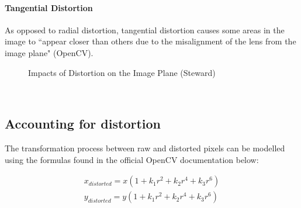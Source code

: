 \documentclass[11pt]{scrartcl}
\begin{document}
\paragraph{Tangential Distortion}
As opposed to radial distortion, tangential distortion causes some areas in the image to ``appear closer than others due to the misalignment of the lens from the image plane" (OpenCV). 
\\
\begin{figure}[!htb]
	\centering
	\qquad
	\label{fig:example}%
	\caption{Impacts of Distortion on the Image Plane (Steward)}
\end{figure}
\\ 

\subsection{Accounting for distortion}

The transformation process between raw and distorted pixels can be modelled using the 
formulas found in the official OpenCV documentation below: 

\begin{theorem}
	\begin{align}
		x_{distorted} = x( 1 + k_1 r^2 + k_2 r^4 + k_3 r^6) 
		                                                    \\ y_{distorted} = y( 1 + k_1 r^2 + k_2 r^4 + k_3 r^6)    
	\end{align}
	    
\end{theorem}
\end{document}
